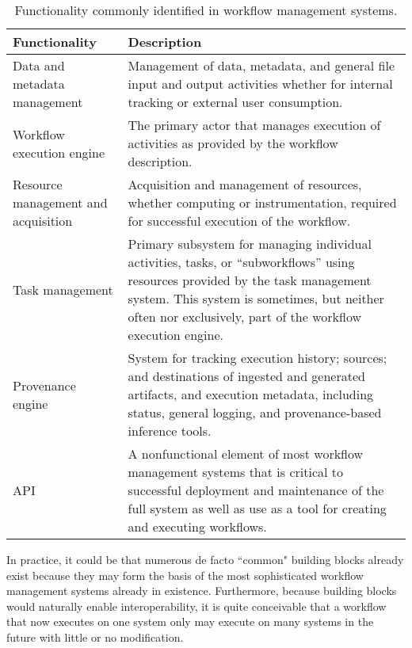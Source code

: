 \begin{table*}[h]
\begin{tabu} to \textwidth {|X[l]|X[l]|} \hline
\textbf{Functionality} & \textbf{Description} \tabularnewline\hline Data and
metadata management & Management of data, metadata, and general file input and
output activities whether for internal tracking or external user
consumption. \\ \hline 
Workflow execution engine & The primary
actor that manages execution of activities as provided by the workflow
description. \tabularnewline\hline 
Resource management and acquisition &
Acquisition and management of resources, whether computing or instrumentation,
required for successful execution of the workflow. \tabularnewline\hline
Task management & Primary subsystem for managing individual activities, tasks,
or ``subworkflows'' using resources provided by the task management system. This
system is sometimes, but neither often nor exclusively, part of the workflow
execution engine. \tabularnewline\hline 
Provenance engine & System for tracking
execution history; sources; and destinations of ingested and generated
artifacts, and execution metadata, including status, general logging, and
provenance-based inference tools. \tabularnewline\hline 
API &
A nonfunctional element of most workflow management systems that is critical to
successful deployment and maintenance of the full system as well as use
as a tool for creating and executing workflows. \tabularnewline\hline
\end{tabu} 
\caption{Functionality commonly identified in workflow management
systems.} 
\label{blocks}
\end{table*}

In practice, it could be that numerous de facto ``common" building blocks
already exist because they may form the basis of the most sophisticated
workflow management systems already in existence. Furthermore, because building
blocks would naturally enable interoperability, it is quite conceivable that a
workflow that now executes on one system only may execute on many systems in
the future with little or no modification.

